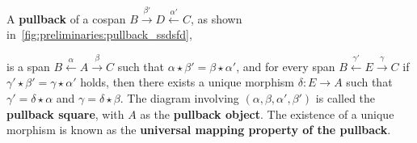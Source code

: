 \begin{definition} 
    \label{def:cat:pb}
   A \textbf{pullback} of a cospan \(B \overset{\beta'}{\rightarrow} D \overset{\alpha'}{\leftarrow} C \), as shown in~\autoref{fig:preliminaries:pullback_ssdsfd},
      \begin{figure}[H]
        \centering  
        \caption{}
        \label{fig:preliminaries:pullback_ssdsfd}
\end{figure}
is a span \( B \overset{\alpha}{\leftarrow} A \overset{\beta}{\rightarrow} C \) such that \( \alpha \star \beta' = \beta \star \alpha' \), and for every span \( B \overset{\gamma'}{\leftarrow} E \overset{\gamma}{\rightarrow} C \) if \(\gamma' \star \beta' = \gamma \star \alpha'\) holds, then there exists a unique morphism \(\delta: E \to A\) such that $\gamma' = \delta \star \alpha$ and $\gamma = \delta \star \beta$. 
The diagram involving \( (\alpha, \beta, \alpha', \beta') \) is called the \textbf{pullback square}, with \(A\) as the \textbf{pullback object}. The existence of a unique morphism is known as the \textbf{universal mapping property of the pullback}.
\end{definition} 

